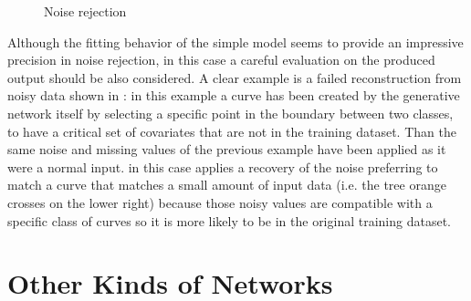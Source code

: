 \begin{figure}
    \centering
    \caption{ Noise rejection } 
    \label{fig:step1_noise}
\end{figure}
Although the fitting behavior of the simple  model seems to provide an impressive precision in noise rejection, in this case a careful evaluation on the produced output should be also considered. A clear example is a failed reconstruction from noisy data shown in \Figure{\ref{fig:step1_noise_rejection_failed}}: in this example a curve has been created by the generative network itself by selecting a specific point in the boundary between two classes, to have a critical set of covariates that are not in the training dataset. Than the same noise and missing values of the previous example have been applied as it were a normal input.  in this case applies a recovery of the noise preferring to match a curve that matches a small amount of input data (i.e. the tree orange crosses on the lower right) because those noisy values are compatible with a specific class of curves so it is more likely to be in the original training dataset.


\section{Other Kinds of Networks}
%
